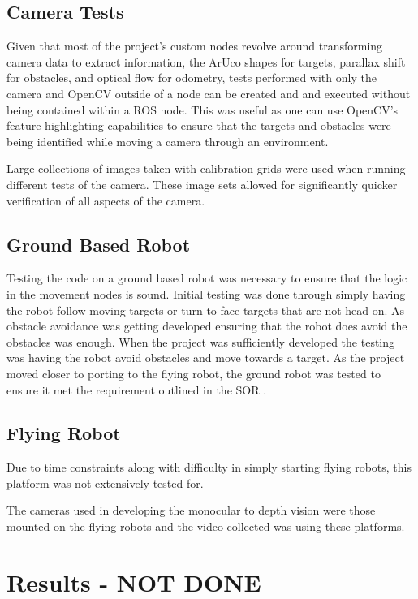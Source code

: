 \documentclass{article}[12]
\begin{document}
	\subsection{Camera Tests}
	
	Given that most of the project's custom nodes revolve around transforming camera data to extract information, the ArUco shapes for targets, parallax shift for obstacles, and optical flow for odometry, tests performed with only the camera and OpenCV outside of a node can be created and and executed without being contained within a ROS node. This was useful as one can use OpenCV's feature highlighting capabilities to ensure that the targets and obstacles were being identified while moving a camera through an environment. 
	
	Large collections of images taken with calibration grids were used when running different tests of the camera. These image sets allowed for significantly quicker verification of all aspects of the camera.
	
	\subsection{Ground Based Robot}
	
	Testing the code on a ground based robot was necessary to ensure that the logic in the movement nodes is sound. Initial testing was done through simply having the robot follow moving targets or turn to face targets that are not head on. As obstacle avoidance was getting developed ensuring that the robot does avoid the obstacles was enough. When the project was sufficiently developed the testing was having the robot avoid obstacles and move towards a target. As the project moved closer to porting to the flying robot, the ground robot was tested to ensure it met the requirement outlined in the SOR \cite{sor}. 

	\subsection{Flying Robot}
	
	Due to time constraints along with difficulty in simply starting flying robots, this platform was not extensively tested for. 
	
	The cameras used in developing the monocular to depth vision were those mounted on the flying robots and the video collected was using these platforms. 

	
\section{Results - NOT DONE}
\end{document}
